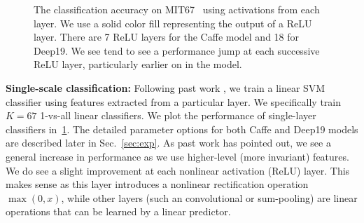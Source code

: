 \documentclass[10pt,twocolumn,letterpaper]{article}
\begin{document}
\begin{figure}[htbp]
\centering
\caption{The classification accuracy on MIT67~\cite{MIT67} using activations from each layer. We use a solid color fill representing the output of a ReLU layer. There are 7 ReLU layers for the Caffe model and 18 for Deep19. We see tend to see a performance jump at each successive ReLU layer, particularly earlier on in the model.}
\label{fig:layer_MIT67}
\end{figure}

{\bf Single-scale classification:} Following past work \cite{cnn_baseline}, we train a linear SVM classifier using features extracted from a particular layer. We specifically train $K=67$ 1-vs-all linear classifiers.
We plot the performance of single-layer classifiers in~\ref{fig:layer_MIT67}. The detailed parameter options for both Caffe and Deep19 models are described later in Sec.~\ref{sec:exp}. As past work has pointed out, we see a general increase in performance as we use higher-level (more invariant) features. We do see a slight improvement at each nonlinear activation (ReLU) layer. This makes sense as this layer introduces a nonlinear rectification operation $\max(0,x)$, while other layers (such an convolutional or sum-pooling) are linear operations that can be learned by a linear predictor.
\end{document}
